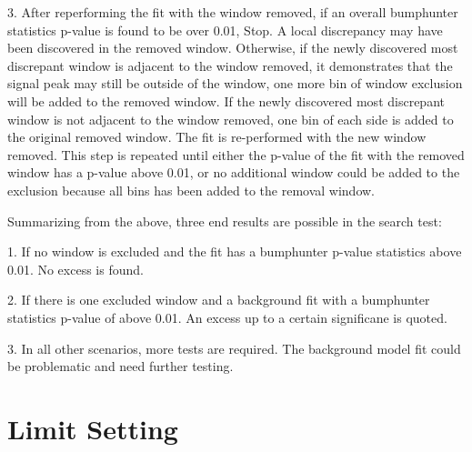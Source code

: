     3. After reperforming the fit with the window removed, if an overall bumphunter statistics p-value is found to be over 0.01, Stop. A local discrepancy may have been discovered in the removed window. Otherwise, if the newly discovered most discrepant window is adjacent to the window removed, it demonstrates that the signal peak may still be outside of the window, one more bin of window exclusion will be added to the removed window. If the newly discovered most discrepant window is not adjacent to the window removed, one bin of each side is added to the original removed window. The fit is re-performed with the new window removed. This step is repeated until either the p-value of the fit with the removed window has a p-value above 0.01, or no additional window could be added to the exclusion because all bins has been added to the removal window.

    Summarizing from the above, three end results are possible in the search test:

    1. If no window is excluded and the fit has a bumphunter p-value statistics above 0.01. No excess is found. 

    2. If there is one excluded window and a background fit with a bumphunter statistics p-value of above 0.01. An excess up to a certain significane is quoted.

    3. In all other scenarios, more tests are required. The background model fit could be problematic and need further testing.  

\section{Limit Setting}
\label{sec:limits}




